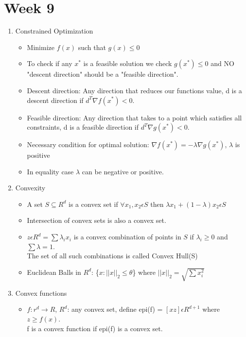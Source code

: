 \documentclass[a4paper]{article}
\begin{document}
 \section{Week 9}
 \begin{enumerate}
     \item Constrained Optimization
     \begin{itemize}
         \item Minimize $f(x)$ such that $g(x)\leq 0$
         \item To check if any $x^*$ is a feasible solution we check $g(x^*)\leq 0$ and NO "descent direction" should be a "feasible direction".
         \item Descent direction: Any direction that reduces our functions value, d is a descent direction if $d^T\nabla f(x^*)<0$.
         \item Feasible direction: Any direction that takes to a point which satisfies all constraints, d is a feasible direction if $d^T\nabla g(x^*)<0$.
         \item Necessary condition for optimal solution: $\nabla f(x^*)=-\lambda \nabla g(x^*)$, $\lambda$ is positive
         \item In equality case $\lambda$ can be negative or positive.
    \end{itemize}
    \item Convexity
    \begin{itemize}
        \item A set $S\subseteq R^d$ is a convex set if $\forall x_1,x_2\epsilon S$ then $\lambda x_1 + (1-\lambda)x_2\epsilon S$
        \item Intersection of convex sets is also a convex set.
        \item $z\epsilon R^d = \sum \lambda_ix_i$ is a convex combination of points in $S$ if $\lambda_i \geq 0$ and $\sum \lambda = 1$.\\
        The set of all such combinations is called Convex Hull(S)
        \item Euclidean Balls in $R^d$: \{$x: ||x||_2\leq \theta$\} where $||x||_2 = \sqrt{\sum x_i^2}$
    \end{itemize}
    \item Convex functions
    \begin{itemize}
        \item $f:r^d\rightarrow R$, $R^d$: any convex set, define epi(f) = $[x z]\epsilon R^{d+1}$ where $z\geq f(x)$.\\
        f is a convex function if epi(f) is a convex set.

\end{itemize}
\end{enumerate}
\end{document}
